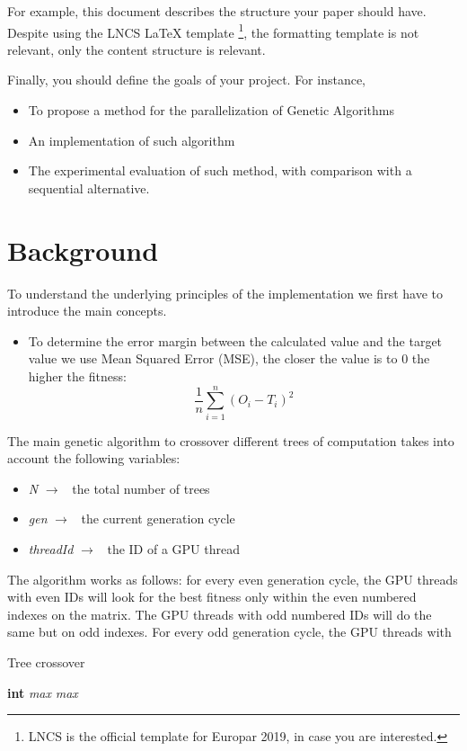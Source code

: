 \documentclass[runningheads]{llncs}
\begin{document}
For example, this document describes the structure your paper should have. Despite using the LNCS LaTeX template \footnote{LNCS is the official template for Europar 2019, in case you are interested.}, the formatting template is not relevant, only the content structure is relevant.

Finally, you should define the goals of your project. For instance,

\begin{itemize}
	\item To propose a method for the parallelization of Genetic Algorithms
	\item An implementation of such algorithm
	\item The experimental evaluation of such method, with comparison with a sequential alternative.
\end{itemize}


\section{Background}
To understand the underlying principles of the implementation we first have to introduce the main concepts.
\begin{itemize}
	\item To determine the error margin between the calculated value and the target value we use Mean Squared Error (MSE), the closer the value is to 0 the higher the fitness: $$\frac{1}{n}\sum_{i=1}^{n} (O_i - T_i)^{2}$$
\end{itemize}

The main genetic algorithm to crossover different trees of computation takes into account the following variables:
\begin{itemize}
	\item \textit{N} $\rightarrow$ \ the total number of trees
	\item \textit{gen} $\rightarrow$ \ the current generation cycle
	\item \textit{threadId} $\rightarrow$ \ the ID of a GPU thread
\end{itemize}

The algorithm works as follows: for every even generation cycle, the GPU threads with even IDs will look for the best fitness only within the even numbered indexes on the matrix. The GPU threads with odd numbered IDs will do the same but on odd indexes.
For every odd generation cycle, the GPU threads with
\begin{algorithm}
\caption{Tree crossover}\label{euclid}
\begin{algorithmic}[1]
\State \textbf{int} \textit{max}
	\EndFor
\Else {}
	\EndFor
\Else
	\EndFor
\EndIf
\EndIf
\State \Return \textit{max}
\EndProcedure
\end{algorithmic}
\end{algorithm}
\end{document}
